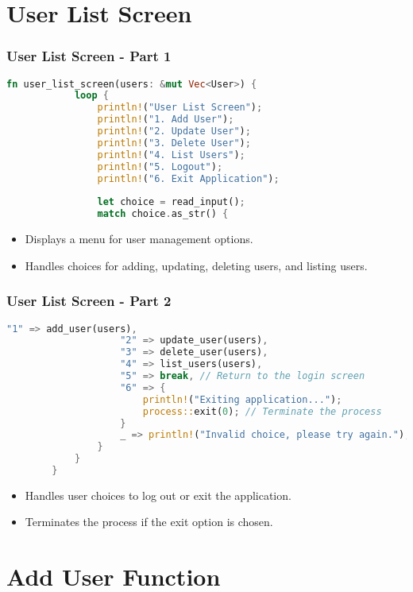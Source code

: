 \documentclass[aspectratio=169, table]{beamer}
\begin{document}
\section{User List Screen}

\begin{frame}[fragile]
	\frametitle{User List Screen - Part 1}
	\vspace{15pt}
	\begin{lstlisting}[language=Rust]
		fn user_list_screen(users: &mut Vec<User>) {
			loop {
				println!("User List Screen");
				println!("1. Add User");
				println!("2. Update User");
				println!("3. Delete User");
				println!("4. List Users");
				println!("5. Logout");
				println!("6. Exit Application");
				
				let choice = read_input();
				match choice.as_str() {
				\end{lstlisting}
				\begin{itemize}
					\item Displays a menu for user management options.
					\item Handles choices for adding, updating, deleting users, and listing users.
				\end{itemize}
			\end{frame}
			
			\begin{frame}[fragile]
			\vspace{15pt}	
				\frametitle{User List Screen - Part 2}
				\begin{lstlisting}[language=Rust]
					"1" => add_user(users),
					"2" => update_user(users),
					"3" => delete_user(users),
					"4" => list_users(users),
					"5" => break, // Return to the login screen
					"6" => {
						println!("Exiting application...");
						process::exit(0); // Terminate the process
					}
					_ => println!("Invalid choice, please try again."),
				}
			}
		}
	\end{lstlisting}
	\begin{itemize}
		\item Handles user choices to log out or exit the application.
		\item Terminates the process if the exit option is chosen.
	\end{itemize}
\end{frame}


\section{Add User Function}
\end{document}
